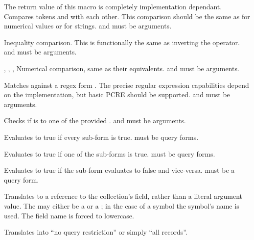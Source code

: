 The return value of this macro is completely implementation dependant.
Compares tokens  and  with each other. This comparison should be the same as  for numerical values or  for strings.  and  must be arguments.

Inequality comparison. This is functionally the same as inverting the \inline{=} operator.  and  must be arguments.

, \inline{:<}, \inline{:<=}, \inline{:>=}
Numerical comparison, same as their  equivalents.  and  must be arguments.

Matches  against a regex form . The precise regular expression capabilities depend on the implementation, but basic PCRE should be supported.
 and  must be arguments.

Checks if  is \inline{=} to one of the provided .
 and  must be arguments.

Evaluates to true if every sub-form is true.
 must be query forms.

Evaluates to true if one of the sub-forms is true.
 must be query forms.

Evaluates to true if the sub-form evaluates to false and vice-versa.
 must be a query form.

Translates to a reference to the collection's field, rather than a literal argument value. The  may either be a  or a ; in the case of a symbol the symbol's name is used. The field name is forced to lowercase.

Translates into ``no query restriction'' or simply ``all records''.
